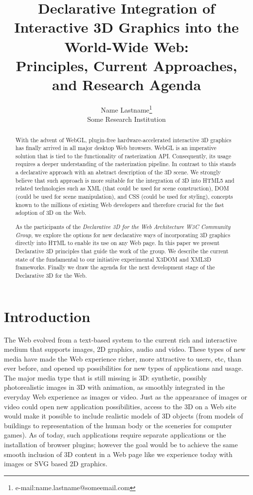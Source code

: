 \documentclass[review]{acmsiggraph}
\title{Declarative Integration of Interactive 3D Graphics into the World-Wide Web:\\Principles, Current Approaches, and Research Agenda}
\author{Name Lastname\thanks{e-mail:name.lastname@someemail.com}\\Some Research Institution}
\begin{document}
\maketitle

\begin{abstract}
With the advent of WebGL, plugin-free hardware-accelerated interactive 3D graphics has finally arrived in all major desktop Web browsers.
WebGL is an imperative solution that is tied to the functionality of rasterization API. Consequently, its usage requires a deeper understanding of the rasterization pipeline. In contrast to this stands a declarative approach with an abstract description of the 3D scene. We strongly believe that such approach is more suitable for the integration of 3D into HTML5 and related technologies such as XML (that could be used for scene construction), DOM (could be used for scene manipulation), and CSS (could be used for styling), concepts known to the millions of existing Web developers and therefore crucial for the fast adoption of 3D on the Web.

As the participants of the \textit{Declarative 3D for the Web Architecture W3C Community Group}, we explore the options for new declarative ways of incorporating 3D graphics directly into HTML to enable its use on any Web page. In this paper we present Declarative 3D principles that guide the work of the group. We describe the current state of the fundamental to our initiative experimental X3DOM and XML3D frameworks. Finally we draw the agenda for the next development stage of the Declarative 3D for the Web.
\end{abstract}

\begin{CRcatlist}
\end{CRcatlist}

\keywordlist
\copyrightspace

\section{Introduction}
The Web evolved from a text-based system to the current rich and interactive medium that supports images, 2D graphics, audio and video. These types of new media have made the Web experience richer, more attractive to users, etc, than ever before, and opened up possibilities for new types of applications and usage. The major media type that is still missing is 3D: synthetic, possibly photorealistic images in 3D with animation, as smoothly integrated in the everyday Web experience as images or video. Just as the appearance of images or video could open new application possibilities, access to the 3D on a Web site would make it possible to include realistic models of 3D objects (from models of buildings to representation of the human body or the sceneries for computer games). As of today, such applications require separate applications or the installation of browser plugins; however the goal would be to achieve the same smooth inclusion of 3D content in a Web page like we experience today with images or SVG based 2D graphics.
\end{document}
